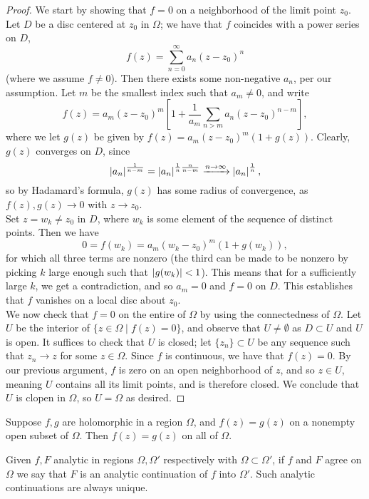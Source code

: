 \begin{proof}
    We start by showing that $f = 0$ on a neighborhood of the limit point $z_0$. Let $D$ be a disc centered at $z_0$ in $\Omega$; we have that $f$ coincides with a power series on $D$,
    \[ f(z) = \sum_{n=0}^\infty a_n (z - z_0)^n \]
    (where we assume $f \neq 0$). Then there exists some non-negative $a_n$, per our assumption. Let $m$ be the smallest index such that $a_m \neq 0$, and write
    \[ f(z) = a_m(z - z_0)^m \left[1 + \frac{1}{a_m} \sum_{n > m} a_n(z - z_0)^{n-m}\right], \]
    where we let $g(z)$ be given by $f(z) = a_m(z - z_0)^m(1 + g(z))$. Clearly, $g(z)$ converges on $D$, since
    \[ \left\lvert a_n \right\rvert^{\frac{1}{n-m}} = \left\lvert a_n \right\rvert^{\frac{1}{n}\frac{n}{n-m}} \xrightarrow{n \to \infty} \left\lvert a_n \right\rvert^{\frac{1}{n}}, \]
    so by Hadamard's formula, $g(z)$ has some radius of convergence, as $f(z), g(z) \to 0$ with $z \to z_0$.
    \\[8pt]
    Set $z = w_k \neq z_0$ in $D$, where $w_k$ is some element of the sequence of distinct points. Then we have
    \[ 0 = f(w_k) = a_m (w_k - z_0)^m (1 + g(w_k)), \]
    for which all three terms are nonzero (the third can be made to be nonzero by picking $k$ large enough such that $\left\lvert g(w_k) \right\rvert < 1$). This means that for a sufficiently large $k$, we get a contradiction, and so $a_m = 0$ and $f = 0$ on $D$. This establishes that $f$ vanishes on a local disc about $z_0$.
    \\[8pt]
    We now check that $f = 0$ on the entire of $\Omega$ by using the connectedness of $\Omega$. Let $U$ be the interior of $\{z \in \Omega \mid f(z) = 0\}$, and observe that $U \neq \emptyset$ as $D \subset U$ and $U$ is open. It suffices to check that $U$ is closed; let $\{z_n\} \subset U$ be any sequence such that $z_n \to z$ for some $z \in \Omega$. Since $f$ is continuous, we have that $f(z) = 0$. By our previous argument, $f$ is zero on an open neighborhood of $z$, and so $z \in U$, meaning $U$ contains all its limit points, and is therefore closed. We conclude that $U$ is clopen in $\Omega$, so $U = \Omega$ as desired.
\end{proof}
\begin{corollary}
    Suppose $f, g$ are holomorphic in a region $\Omega$, and $f(z) = g(z)$ on a nonempty open subset of $\Omega$. Then $f(z) = g(z)$ on all of $\Omega$.
\end{corollary}
\begin{remark}
    Given $f, F$ analytic in regions $\Omega, \Omega'$ respectively with $\Omega \subset \Omega'$, if $f$ and $F$ agree on $\Omega$ we say that $F$ is an analytic continuation of $f$ into $\Omega'$. Such analytic continuations are always unique.
\end{remark}